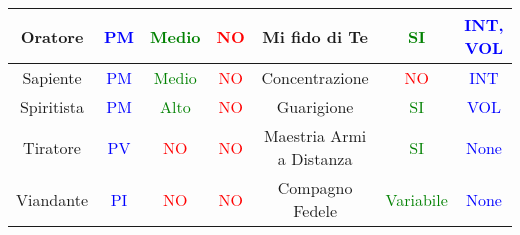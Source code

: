 \documentclass{article}
\begin{document}
\begin{table}[h]
\begin{tabular}{|c|c|c|c|c|c|c|}
      \hline
      \centering Oratore & \textcolor{blue}{PM} & \textcolor{green}{Medio} & \textcolor{red}{NO} & Mi fido di Te & \textcolor{green}{SI} &\textcolor{blue}{INT, VOL} \\
      \hline
      \centering Sapiente & \textcolor{blue}{PM} & \textcolor{green}{Medio} & \textcolor{red}{NO} & Concentrazione & \textcolor{red}{NO} &\textcolor{blue}{INT} \\
      \hline
      \centering Spiritista & \textcolor{blue}{PM} & \textcolor{green}{Alto} & \textcolor{red}{NO} & Guarigione & \textcolor{green}{SI} &\textcolor{blue}{VOL} \\
      \hline
      \centering Tiratore & \textcolor{blue}{PV} & \textcolor{red}{NO} & \textcolor{red}{NO} & Maestria Armi a Distanza & \textcolor{green}{SI} &\textcolor{blue}{None} \\
      \hline
      \centering Viandante & \textcolor{blue}{PI} & \textcolor{red}{NO} & \textcolor{red}{NO} & Compagno Fedele & \textcolor{green}{Variabile} &\textcolor{blue}{None} \\
      \hline
    \end{tabular}
  \end{table}
\end{document}

